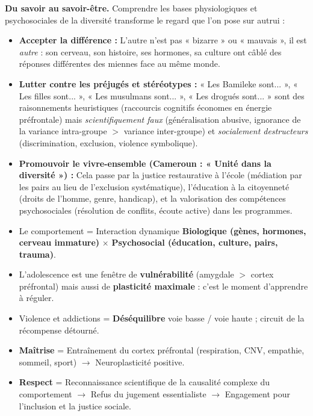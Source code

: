 \documentclass[11pt]{article}
\newcommand{\cle}[1]{{\popxbold\color{popdark}#1}}
\begin{document}
\textbf{Du savoir au savoir-être.}
Comprendre les bases physiologiques et psychosociales de la diversité transforme le regard que l'on pose sur autrui :
\begin{itemize}
  \item \textbf{Accepter la différence :} L'autre n'est pas « bizarre » ou « mauvais », il est \emph{autre} : son cerveau, son histoire, ses hormones, sa culture ont câblé des réponses différentes des miennes face au même monde.
  \item \textbf{Lutter contre les préjugés et stéréotypes :} « Les Bamileke sont... », « Les filles sont... », « Les musulmans sont... », « Les drogués sont... » sont des \cle{raisonnements heuristiques} (raccourcis cognitifs économes en énergie préfrontale) mais \emph{scientifiquement faux} (généralisation abusive, ignorance de la variance intra-groupe $>$ variance inter-groupe) et \emph{socialement destructeurs} (discrimination, exclusion, violence symbolique).
  \item \textbf{Promouvoir le vivre-ensemble (Cameroun : « Unité dans la diversité ») :} Cela passe par la \cle{justice restaurative} à l'école (médiation par les pairs au lieu de l'exclusion systématique), l'\cle{éducation à la citoyenneté} (droits de l'homme, genre, handicap), et la \cle{valorisation des compétences psychosociales} (résolution de conflits, écoute active) dans les programmes.
\end{itemize}

\begin{aretenir}
\begin{itemize}
  \item Le comportement = Interaction dynamique \textbf{Biologique (gènes, hormones, cerveau immature)} $\times$ \textbf{Psychosocial (éducation, culture, pairs, trauma)}.
  \item L'adolescence est une fenêtre de \textbf{vulnérabilité} (amygdale $>$ cortex préfrontal) mais aussi de \textbf{plasticité maximale} : c'est le moment d'apprendre à réguler.
  \item Violence et addictions = \textbf{Déséquilibre} voie basse / voie haute ; circuit de la récompense détourné.
  \item \textbf{Maîtrise} = Entraînement du cortex préfrontal (respiration, CNV, empathie, sommeil, sport) $\rightarrow$ Neuroplasticité positive.
  \item \textbf{Respect} = Reconnaissance scientifique de la causalité complexe du comportement $\rightarrow$ Refus du jugement essentialiste $\rightarrow$ Engagement pour l'inclusion et la justice sociale.
\end{itemize}
\end{aretenir}
\end{document}

